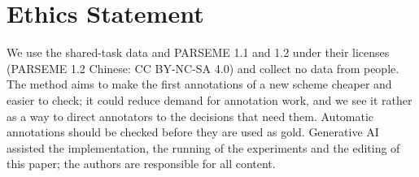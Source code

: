 \section*{Ethics Statement}
We use the \umr shared-task data and PARSEME 1.1 and 1.2 under their licenses (PARSEME 1.2 Chinese: CC BY-NC-SA 4.0) and collect no data from people. The method aims to make the first annotations of a new scheme cheaper and easier to check; it could reduce demand for annotation work, and we see it rather as a way to direct annotators to the decisions that need them. Automatic annotations should be checked before they are used as gold. Generative AI assisted the implementation, the running of the experiments and the editing of this paper; the authors are responsible for all content.
